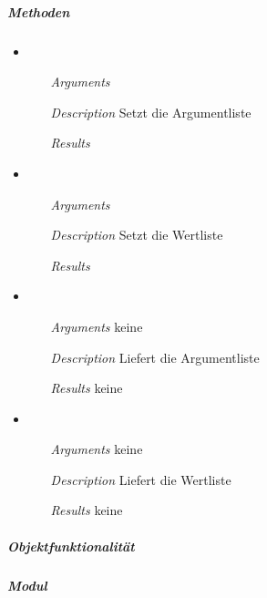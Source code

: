 \subparagraph{Methoden}
\begin{itemize}

\item {}
\begin{enumerate}
\item[\textit{Arguments}] 
\item[\textit{Description}] Setzt die Argumentliste
\item[\textit{Results}] 
\end{enumerate}

\item {}
\begin{enumerate}
\item[\textit{Arguments}] 
\item[\textit{Description}] Setzt die Wertliste
\item[\textit{Results}] 
\end{enumerate}

\item {}
\begin{enumerate}
\item[\textit{Arguments}] keine
\item[\textit{Description}] Liefert die Argumentliste
\item[\textit{Results}] keine
\end{enumerate}

\item {}
\begin{enumerate}
\item[\textit{Arguments}] keine
\item[\textit{Description}] Liefert die Wertliste
\item[\textit{Results}] keine
\end{enumerate}

\end{itemize}


\newpage

\subparagraph{Objektfunktionalit\"at}


\newpage

\paragraph{}
\subparagraph{Modul}

